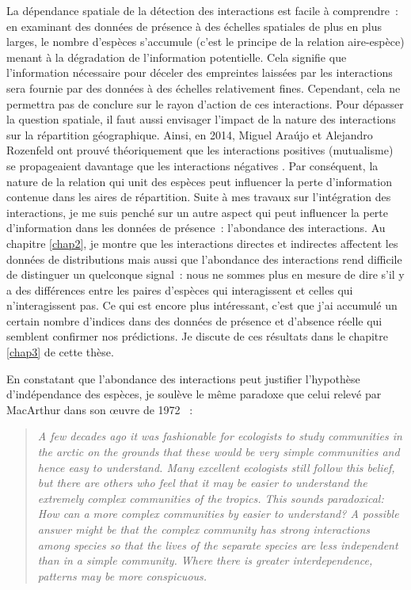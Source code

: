 La dépendance spatiale de la détection des interactions est facile à
comprendre~: en examinant des données de présence à des échelles
spatiales de plus en plus larges, le nombre d'espèces s'accumule (c'est
le principe de la relation aire-espèce) menant à la dégradation de
l'information potentielle. Cela signifie que l'information nécessaire
pour déceler des empreintes laissées par les interactions sera fournie
par des données à des échelles relativement fines. Cependant, cela ne
permettra pas de conclure sur le rayon d'action de ces interactions.
Pour dépasser la question spatiale, il faut aussi envisager l'impact de
la nature des interactions sur la répartition géographique. Ainsi, en
2014, Miguel Araújo et Alejandro Rozenfeld ont prouvé théoriquement que
les interactions positives (mutualisme) se propageaient davantage que
les interactions négatives \citep{Araujo2014}. Par conséquent, la nature
de la relation qui unit des espèces peut influencer la perte
d'information contenue dans les aires de répartition. Suite à mes
travaux sur l'intégration des interactions, je me suis penché sur un
autre aspect qui peut influencer la perte d'information dans les données
de présence~: l'abondance des interactions. Au chapitre \ref{chap2}, je
montre que les interactions directes et indirectes affectent les données
de distributions mais aussi que l'abondance des interactions rend
difficile de distinguer un quelconque signal~: nous ne sommes plus en
mesure de dire s'il y a des différences entre les paires d'espèces qui
interagissent et celles qui n'interagissent pas. Ce qui est encore plus
intéressant, c'est que j'ai accumulé un certain nombre d'indices dans
des données de présence et d'absence réelle qui semblent confirmer nos
prédictions. Je discute de ces résultats dans le chapitre \ref{chap3} de
cette thèse.

En constatant que l'abondance des interactions peut justifier
l'hypothèse d'indépendance des espèces, je soulève le même paradoxe que
celui relevé par MacArthur dans son œuvre de 1972
\citep{macarthur1972geographical}~:

\begin{quote}
\emph{A few decades ago it was fashionable for ecologists to study
communities in the arctic on the grounds that these would be very simple
communities and hence easy to understand. Many excellent ecologists
still follow this belief, but there are others who feel that it may be
easier to understand the extremely complex communities of the tropics.
This sounds paradoxical: How can a more complex communities by easier to
understand? A possible answer might be that the complex community has
strong interactions among species so that the lives of the separate
species are less independent than in a simple community. Where there is
greater interdependence, patterns may be more conspicuous.}
\end{quote}

